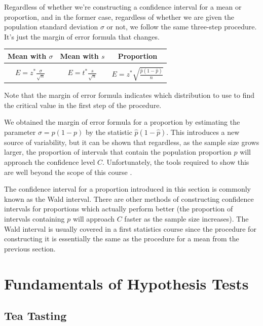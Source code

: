 \begin{keypoint}
Regardless of whether we're constructing a confidence interval for a mean or proportion, and in the former case, regardless of whether we are given the population standard deviation $\sigma$ or not, we follow the same three-step procedure. It's just the margin of error formula that changes.
\begin{center}
\begin{tabular}{c|c|c}
Mean with $\sigma$ & Mean with $s$ & Proportion  \\ \hline & & \\[-2ex]
$E = z^*\frac{\sigma}{\sqrt{n}}$ & $E = t^*\frac{s}{\sqrt{n}}$ & $E = z^*\sqrt{\frac{\widehat{p}(1-\widehat{p})}{n}}$
\end{tabular}
\end{center}
Note that the margin of error formula indicates which distribution to use to find the critical value in the first step of the procedure.
\end{keypoint}


We obtained the margin of error formula for a proportion by estimating the parameter $\sigma = p(1-p)$ by the statistic $\widehat{p}(1-\widehat{p})$. This introduces a new source of variability, but it can be shown that regardless, as the sample size grows larger, the proportion of intervals that contain the population proportion $p$ will approach the confidence level $C$. Unfortunately, the tools required to show this are well beyond the scope of this course \cite{vanderVaart}.

\begin{remark}
The confidence interval for a proportion introduced in this section is commonly known as the Wald interval. There are other methods of constructing confidence intervals for proportions which actually perform better (the proportion of intervals containing $p$ will approach $C$ faster as the sample size increases). The Wald interval is usually covered in a first statistics course since the procedure for constructing it is essentially the same as the procedure for a mean from the previous section.
\end{remark}

\section{Fundamentals of Hypothesis Tests}

\subsection*{Tea Tasting}


